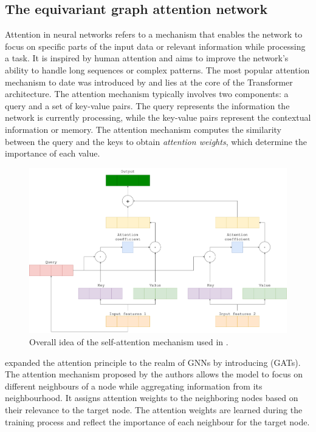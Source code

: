 \subsection{The equivariant graph attention network}
\label{eqgat-math}
Attention in neural networks refers to a mechanism that enables the network to focus on specific parts of the input data or relevant information while processing a task. It is inspired by human attention and aims to improve the network's ability to handle long sequences or complex patterns. The most popular attention mechanism to date was introduced by \citet{vaswani2017attention} and lies at the core of the Transformer architecture. 
{\color{red}
The attention mechanism typically involves two components: a query and a set of key-value pairs. The query represents the information the network is currently processing, while the key-value pairs represent the contextual information or memory. The attention mechanism computes the similarity between the query and the keys to obtain \textit{attention weights}, which determine the importance of each value.}

\begin{figure}[!h]
    \centering
    \includegraphics[width=\textwidth]{masters-report/figures/attention.png}
    \caption{Overall idea of the self-attention mechanism used in \citet{vaswani2017attention}.}
    \label{attention}
\end{figure}

\citet{gat} expanded the attention principle to the realm of GNNs by introducing  (GATs). The attention mechanism proposed by the authors allows the model to focus on different neighbours of a node while aggregating information from its neighbourhood. It assigns attention weights to the neighboring nodes based on their relevance to the target node. The attention weights are learned during the training process and reflect the importance of each neighbour for the target node.

